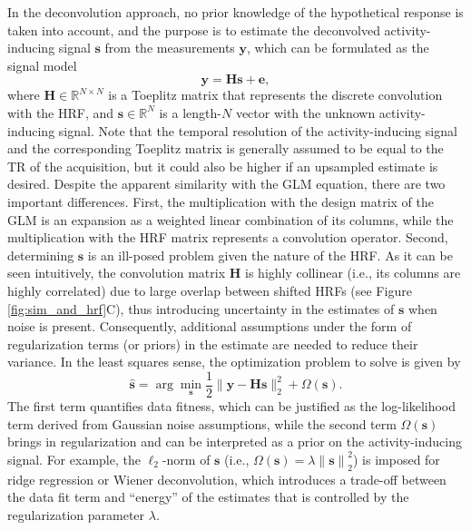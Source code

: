 In the deconvolution approach, no prior knowledge of the hypothetical response is taken into account, and the purpose is to estimate the deconvolved activity-inducing signal $\mathbf{s}$ from the measurements $\mathbf{y}$, which can be formulated as the signal model
\begin{equation}
    \label{eq:synthesis_model}
    \mathbf{y} = \mathbf{Hs} + \mathbf{e},
\end{equation}
where $\mathbf{H} \in \mathbb{R}^{N \times N}$ is a Toeplitz matrix that represents the discrete convolution with the HRF, and $\mathbf{s} \in \mathbb{R}^{N}$ is a length-$N$ vector with the unknown activity-inducing signal. Note that the temporal resolution of the activity-inducing signal and the corresponding Toeplitz matrix is generally assumed to be equal to the TR of the acquisition, but it could also be higher if an upsampled estimate is desired. Despite the apparent similarity with the GLM equation, there are two important differences. First, the multiplication with the design matrix of the GLM is an expansion as a weighted linear combination of its columns, while the multiplication with the HRF matrix represents a convolution operator. Second, determining $\mathbf{s}$ is an ill-posed problem given the nature of the HRF. As it can be seen intuitively, the convolution matrix $\mathbf{H}$ is highly collinear (i.e., its columns are highly correlated) due to large overlap between shifted HRFs (see Figure \ref{fig:sim_and_hrf}C), thus introducing uncertainty in the estimates of $\mathbf{s}$ when noise is present. Consequently, additional assumptions under the form of regularization terms (or priors) in the estimate are needed to reduce their variance. In the least squares sense, the optimization problem to solve is given by 
\begin{equation}
    \label{eq:regularized_least_squares}
    \hat{\mathbf{s}} = \arg \min_{\mathbf{s}} \frac{1}{2} \| \mathbf{y} - \mathbf{Hs} \|_2^2 + \Omega(\mathbf{s}).
\end{equation}
The first term quantifies data fitness, which can be justified as the log-likelihood term derived from Gaussian noise assumptions, while the second term \(\Omega(\mathbf{s})\) brings in regularization and can be interpreted as a prior on the activity-inducing signal. For example, the $\ell_2$-norm of $\mathbf{s}$ (i.e., $\Omega(\mathbf{s})=\lambda \left\| \mathbf{s}\right\|_2^2$) is imposed for ridge regression or Wiener deconvolution, which introduces a trade-off between the data fit term and ``energy'' of the estimates that is controlled by the regularization parameter $\lambda$. %


